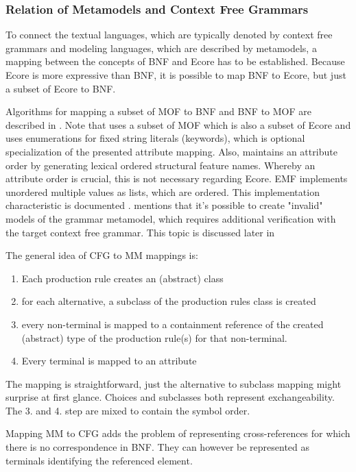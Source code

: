 \subsubsection{Relation of Metamodels and Context Free Grammars} \label{sec:MM:CFGs}
To connect the textual languages, which are typically denoted by context free grammars and modeling languages, which are described by metamodels, a mapping between the concepts of BNF and Ecore has to be established. Because Ecore is more expressive than BNF, it is possible to map BNF to Ecore, but just a subset of Ecore to BNF.

Algorithms for mapping a subset of MOF to BNF and BNF to MOF are described in \cite{MofCfg}. Note that \cite{MofCfg} uses a subset of MOF which is also a subset of Ecore and uses enumerations for fixed string literals (keywords), which is optional specialization of the presented attribute mapping. Also,  \cite{MofCfg} maintains an attribute order by generating lexical ordered structural feature names. Whereby an attribute order is crucial, this is not necessary regarding Ecore. EMF implements unordered multiple values as lists, which are ordered. This implementation characteristic is documented \cite{EMF2nd}.  \cite{MofCfg} mentions that it's possible to create "invalid" models of the grammar metamodel, which requires additional verification with the target context free grammar. This topic is discussed later in 

The general idea of CFG to MM mappings is:
\begin{enumerate}
	\item Each production rule creates an (abstract) class
	\item for each alternative,  a subclass of the production rules class is created
	\item every non-terminal is mapped to a containment reference of the created (abstract) type of the production rule(s) for that non-terminal.
	\item Every terminal is mapped to an attribute
\end{enumerate}

The mapping is straightforward, just the alternative to subclass mapping might surprise at first glance. Choices and subclasses both represent exchangeability. The 3. and 4. step are mixed to contain the symbol order.

Mapping MM to CFG adds the problem of representing cross-references for which there is no correspondence in BNF. They can however be represented as terminals identifying the referenced element.   

